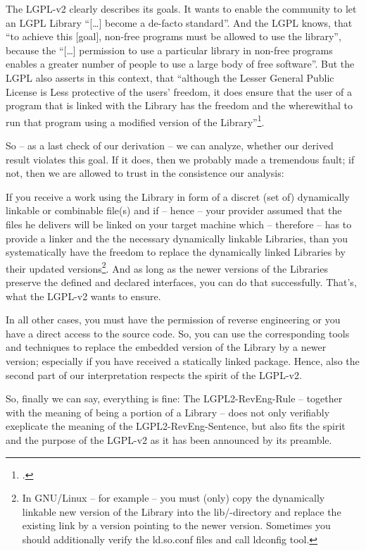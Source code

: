 The LGPL-v2 clearly describes its goals. It wants to enable the community to let
an LGPL Library \enquote{[\ldots] become a de-facto standard}. And the LGPL
knows, that \enquote{to achieve this [goal], non-free programs must be allowed
to use the library}, because the \enquote{[\ldots] permission to use a particular
library in non-free programs enables a greater number of people to use a large
body of free software}. But the LGPL also asserts in this context, that
\enquote{although the Lesser General Public License is Less protective of the
users' freedom, it does ensure that the user of a program that is linked with
the Library has the freedom and the wherewithal to run that program using a
modified version of the Library}\footcite[cf.][\nopage wp., preamble, emphasis
KR]{Lgpl21OsiLicense1999a}.

So -- as a last check of our derivation -- we can analyze, whether our derived
result violates this goal. If it does, then we probably made a tremendous fault;
if not, then we are allowed to trust in the consistence our analysis:

If you receive a work using the Library in form of a discret (set of)
dynamically linkable or combinable file(s) and if -- hence -- your provider
assumed that the files he delivers will be linked on your target machine which
-- therefore -- has to provide a linker and the the necessary dynamically
linkable Libraries, than you systematically have the freedom to replace the
dynamically linked Libraries by their updated versions\footnote{In GNU/Linux --
for example -- you must (only) copy the dynamically linkable new version of the
Library into the lib/-directory and replace the existing link by a version
pointing to the newer version. Sometimes you should additionally verify the
ld.so.conf files and call ldconfig tool.}. And as long as the newer versions of
the Libraries preserve the defined and declared interfaces, you can do that
successfully. That's, what the LGPL-v2 wants to ensure.

In all other cases, you must have the permission of reverse engineering or you
have a direct access to the source code. So, you can use the corresponding tools
and techniques to replace the embedded version of the Library by a newer
version; especially if you have received a statically linked package. Hence,
also the second part of our interpretation respects the spirit of the LGPL-v2.

So, finally we can say, everything is fine: The LGPL2-RevEng-Rule -- together
with the meaning of being a portion of a Library -- does not only verifiably
exeplicate the meaning of the LGPL2-RevEng-Sentence, but also fits the spirit
and the purpose of the LGPL-v2 as it has been announced by its preamble.



